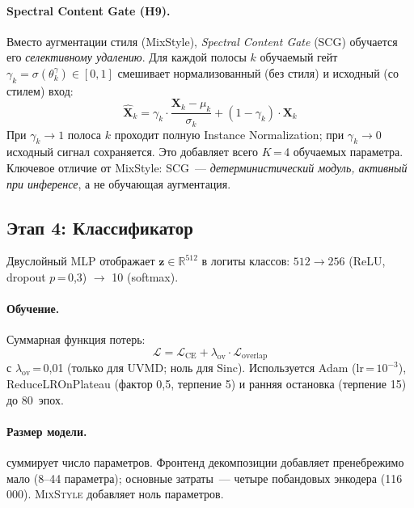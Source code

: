 \documentclass[conference]{IEEEtran}
\newcommand{\mixstyle}{\textsc{MixStyle}}
\newcommand{\uvmd}{\textsc{UVMD}}
\begin{document}
\paragraph{Spectral Content Gate (H9).}
Вместо аугментации стиля (MixStyle), \emph{Spectral Content Gate} (SCG) обучается его \emph{селективному удалению}. Для каждой полосы $k$ обучаемый гейт $\gamma_k = \sigma(\theta_k^{\gamma}) \in [0, 1]$ смешивает нормализованный (без стиля) и исходный (со стилем) вход:
\begin{equation}
\hat{\mathbf{X}}_k = \gamma_k \cdot \frac{\mathbf{X}_k - \mu_k}{\sigma_k} + (1 - \gamma_k) \cdot \mathbf{X}_k
\label{eq:scg}
\end{equation}
При $\gamma_k \to 1$ полоса $k$ проходит полную Instance Normalization; при $\gamma_k \to 0$ исходный сигнал сохраняется. Это добавляет всего $K$\,=\,4 обучаемых параметра. Ключевое отличие от MixStyle: SCG~--- \emph{детерминистический модуль, активный при инференсе}, а не обучающая аугментация.

\subsection{Этап 4: Классификатор}
Двуслойный MLP отображает $\mathbf{z} \in \mathbb{R}^{512}$ в логиты классов:
$512 \to 256$ (ReLU, dropout $p$\,=\,0,3) $\to$ 10 (softmax).

\paragraph{Обучение.}
Суммарная функция потерь:
\begin{equation}
\mathcal{L} = \mathcal{L}_{\mathrm{CE}} + \lambda_{\mathrm{ov}} \cdot \mathcal{L}_{\mathrm{overlap}}
\end{equation}
с $\lambda_{\mathrm{ov}}$\,=\,0,01 (только для \uvmd{}; ноль для Sinc).
Используется Adam ($\mathrm{lr}$\,=\,$10^{-3}$), ReduceLROnPlateau (фактор 0,5, терпение 5) и ранняя остановка (терпение 15) до 80~эпох.

\paragraph{Размер модели.}
 суммирует число параметров.
Фронтенд декомпозиции добавляет пренебрежимо мало (8--44 параметра); основные затраты~--- четыре побандовых энкодера (116\,000).
\mixstyle{} добавляет ноль параметров.
\end{document}
